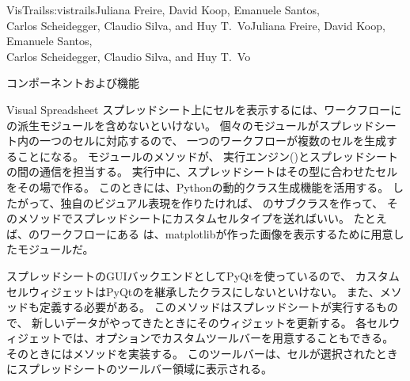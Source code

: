 \begin{aosachaptertoc}{VisTrails}{s:vistrails}{Juliana Freire, David Koop, Emanuele Santos, \\ Carlos Scheidegger, Claudio Silva, and Huy T.\ Vo}{Juliana Freire, David Koop, Emanuele Santos, \\ \hspace*{0.9cm} Carlos Scheidegger, Claudio Silva, and Huy T.\ Vo}
\begin{aosasect1}{コンポーネントおよび機能}
\begin{aosasect2}{Visual Spreadsheet}
スプレッドシート上にセルを表示するには、ワークフローに
の派生モジュールを含めないといけない。
個々のモジュールがスプレッドシート内の一つのセルに対応するので、
一つのワークフローが複数のセルを生成することになる。
モジュールのメソッドが、
実行エンジン()とスプレッドシートの間の通信を担当する。
実行中に、スプレッドシートはその型に合わせたセルをその場で作る。
このときには、Pythonの動的クラス生成機能を活用する。
したがって、独自のビジュアル表現を作りたければ、
のサブクラスを作って、
そのメソッドでスプレッドシートにカスタムセルタイプを送ればいい。
たとえば、のワークフローにある
は、matplotlibが作った画像を表示するために用意したモジュールだ。

スプレッドシートのGUIバックエンドとしてPyQtを使っているので、
カスタムセルウィジェットはPyQtのを継承したクラスにしないといけない。
また、メソッドも定義する必要がある。
このメソッドはスプレッドシートが実行するもので、
新しいデータがやってきたときにそのウィジェットを更新する。
各セルウィジェットでは、オプションでカスタムツールバーを用意することもできる。
そのときにはメソッドを実装する。
このツールバーは、セルが選択されたときにスプレッドシートのツールバー領域に表示される。


\end{aosasect2}
\end{aosasect1}
\end{aosachaptertoc}
